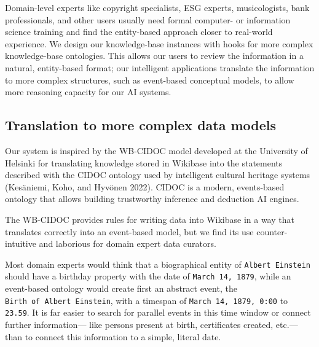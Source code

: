 \documentclass[
  letterpaper,
  DIV=11,
  numbers=noendperiod]{scrreprt}
\begin{document}
Domain-level experts like copyright specialists, ESG experts,
musicologists, bank professionals, and other users usually need formal
computer- or information science training and find the entity-based
approach closer to real-world experience. We design our knowledge-base
instances with hooks for more complex knowledge-base ontologies. This
allows our users to review the information in a natural, entity-based
format; our intelligent applications translate the information to more
complex structures, such as event-based conceptual models, to allow more
reasoning capacity for our AI systems.

\subsection{Translation to more complex data
models}\label{translation-to-more-complex-data-models}

Our system is inspired by the WB-CIDOC model developed at the University
of Helsinki for translating knowledge stored in Wikibase into the
statements described with the CIDOC ontology used by intelligent
cultural heritage systems (Kesäniemi, Koho, and Hyvönen 2022). CIDOC is
a modern, events-based ontology that allows building trustworthy
inference and deduction AI engines.

The WB-CIDOC provides rules for writing data into Wikibase in a way that
translates correctly into an event-based model, but we find its use
counter-intuitive and laborious for domain expert data curators.

Most domain experts would think that a biographical entity of
\texttt{Albert\ Einstein} should have a birthday property with the date
of \texttt{March\ 14,\ 1879}, while an event-based ontology would create
first an abstract event, the \texttt{Birth\ of\ Albert\ Einstein}, with
a timespan of \texttt{March\ 14,\ 1879,\ 0:00} to \texttt{23.59}. It is
far easier to search for parallel events in this time window or connect
further information--- like persons present at birth, certificates
created, etc.---than to connect this information to a simple, literal
date.
\end{document}
